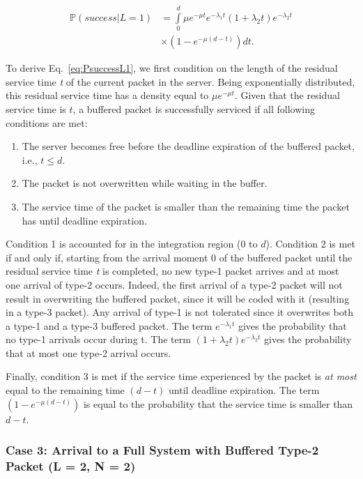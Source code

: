 \documentclass[preprint,12pt]{elsarticle}
\theoremstyle{definition}
\theoremstyle{plain}
\theoremstyle{remark}
\renewcommand{\P}{\ensuremath{\mathbb{P}}}
\newcommand{\e}{e}
\begin{document}
\begin{equation}\label{eq:PsuccessL1}
\begin{split}
\P(success|L = 1) & =  \int\limits_{0}^{d}  \mu\e^{-\mu t} \e^{-\lambda_{1} t} (1+\lambda_{2}t)\e^{-\lambda_{2} t}   \\ &\times(1-\e^{-\mu(d-t)})dt.
\end{split}
\end{equation}

To derive Eq.~\eqref{eq:PsuccessL1}, we first condition on the length of the residual service time \textit{t} of the current packet in the server. Being exponentially distributed, this residual service time has a density equal to $\mu \e^{-\mu t}$. Given that the residual service time is $t$, a buffered packet is successfully serviced if all following conditions are met:
\begin{enumerate}
	\item The server becomes free before the deadline expiration of the buffered packet, i.e., $t\leq d$.
	\item The packet is not overwritten while waiting in the buffer.
	\item The service time of the packet is smaller than the remaining time the packet has until deadline expiration.
\end{enumerate}

Condition 1 is accounted for in the integration region (0 to $d$). Condition 2 is met if and only if, starting from the arrival moment 0 of the buffered packet until the residual service time \textit{t} is completed, no new type-1 packet arrives and at most one arrival of type-2 occurs. Indeed, the first arrival of a type-2 packet will not result in overwriting the buffered packet, since it will be coded with it (resulting in a type-3 packet). Any arrival of type-1 is not tolerated since it overwrites both a type-1 and a type-3 buffered packet. The term $\e^{-\lambda_{1} t}$ gives the probability that no type-1 arrivals occur during t. The term $(1 + \lambda_{2}t)\e^{-\lambda_{2} t}$ gives the probability that at most one type-2 arrival occurs.

Finally, condition 3 is met if the service time experienced by the packet is \textit{at most} equal to the remaining time $(d-t)$ until deadline expiration. The term $(1-\e^{-\mu(d-t)})$ is equal to the probability that the service time is smaller than $d-t$.

\smallskip

\subsubsection{Case 3: Arrival to a Full System with Buffered Type-2 Packet (L = 2, N = 2)}
\end{document}
